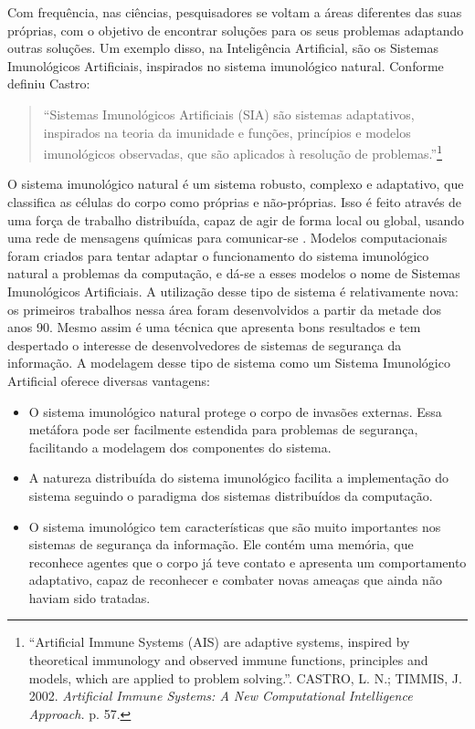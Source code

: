 Com frequência, nas ciências, pesquisadores se voltam a áreas diferentes das suas próprias, com o objetivo de encontrar soluções para os seus problemas adaptando outras soluções. Um exemplo disso, na Inteligência Artificial, são os Sistemas Imunológicos Artificiais, inspirados no sistema imunológico natural. Conforme definiu Castro:

\begin{quote}
``Sistemas Imunológicos Artificiais (SIA) são sistemas adaptativos, inspirados na teoria da imunidade e funções, princípios e modelos imunológicos observadas, que são aplicados à resolução de problemas.''\footnote{``Artificial Immune Systems (AIS) are adaptive systems, inspired by theoretical immunology and observed immune functions, principles and models, which are applied to problem solving.''. CASTRO, L. N.; TIMMIS, J. 2002. \emph{Artificial Immune Systems: A New Computational Intelligence Approach.} p. 57.}
\end{quote}

O sistema imunológico natural é um sistema robusto, complexo e adaptativo, que classifica as células do corpo como próprias e não-próprias. Isso é feito através de uma força de trabalho distribuída, capaz de agir de forma local ou global, usando uma rede de mensagens químicas para comunicar-se \cite{Aickelin2005}. Modelos computacionais foram criados para tentar adaptar o funcionamento do sistema imunológico natural a problemas da computação, e dá-se a esses modelos o nome de Sistemas Imunológicos Artificiais. A utilização desse tipo de sistema é relativamente nova: os primeiros trabalhos nessa área foram desenvolvidos a partir da metade dos anos 90. Mesmo assim é uma técnica que apresenta bons resultados e tem despertado o interesse de desenvolvedores de sistemas de segurança da informação. A modelagem desse tipo de sistema como um Sistema Imunológico Artificial oferece diversas vantagens:

\begin{itemize}
\item O sistema imunológico natural protege o corpo de invasões externas. Essa metáfora pode ser facilmente estendida para problemas de segurança, facilitando a modelagem dos componentes do sistema.
\item A natureza distribuída do sistema imunológico facilita a implementação do sistema seguindo o paradigma dos sistemas distribuídos da computação.
\item O sistema imunológico tem características que são muito importantes nos sistemas de segurança da informação. Ele contém uma memória, que reconhece agentes que o corpo já teve contato e apresenta um comportamento adaptativo, capaz de reconhecer e combater novas ameaças que ainda não haviam sido tratadas.
\end{itemize}

